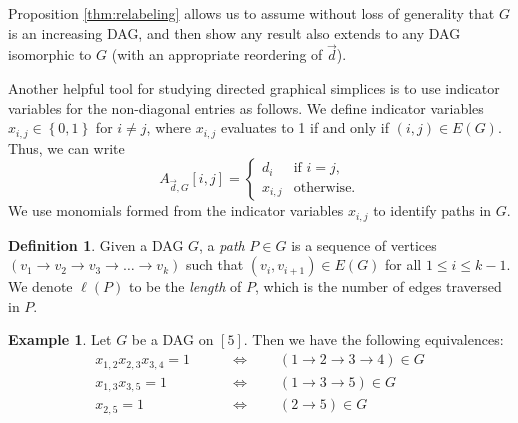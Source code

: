 \documentclass[12pt]{amsart}
\theoremstyle{definition}
\newtheorem{example}[thm]{Example}
\newtheorem{defn}[thm]{Definition}
\numberwithin{equation}{section}
\renewcommand\>{\rangle}
\newcommand\<{\langle}
\newcommand\0{\mathbf{0}}
\renewcommand\iff{\Leftrightarrow}
\newcommand\set[1]{\left\{#1\right\}}
\begin{document}
Proposition \ref{thm:relabeling} allows us to assume without loss of generality that $G$ is an increasing DAG, and then show any result also extends to any DAG isomorphic to $G$ (with an appropriate reordering of $\vec{d}$).

Another helpful tool for studying directed graphical simplices is to use indicator variables for the non-diagonal entries as follows. We define indicator variables $x_{i,j} \in \set{0,1}$ for $i\neq j$, where $x_{i,j}$ evaluates to 1 if and only if $(i,j) \in E(G)$. 
Thus, we can write
\[
A_{\vec{d}, G}[i,j] = \begin{cases}
	d_i & \text{if } i = j,\\
	x_{i,j} & \text{otherwise}.
\end{cases}\]
We use monomials formed from the indicator variables $x_{i,j}$ to identify paths in $G$. 

\begin{defn}
	Given a DAG $G$, a \emph{path} $P \in G$ is a sequence of vertices $(v_1 \to v_2 \to v_3 \to \dots \to v_k)$ such that $(v_i, v_{i+1}) \in E(G)$ for all $1 \leq i \leq k-1$. We denote $\ell(P)$ to be the \emph{length} of $P$, which is the number of edges traversed in $P$.
\end{defn}


\begin{example}
	Let $G$ be a DAG on $[5]$. Then we have the following equivalences:
	\begin{align*}
		x_{1,2}x_{2,3}x_{3,4} = 1 \qquad &\iff \qquad (1\to 2\to 3\to 4) \in G\\
		x_{1,3}x_{3,5} =1 \qquad &\iff \qquad (1 \to 3 \to 5) \in G\\
		x_{2,5} = 1\qquad &\iff \qquad (2 \to 5) \in G
	\end{align*}
\end{example} 
\end{document}
